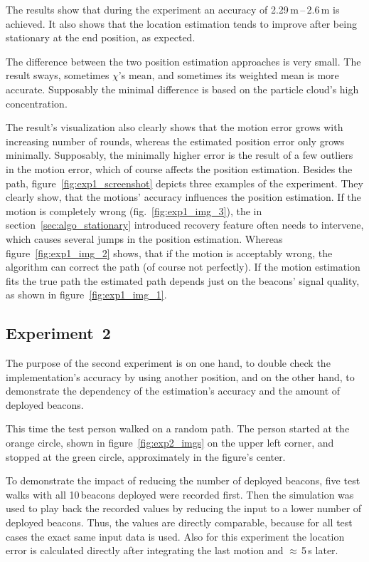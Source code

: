The results show that during the experiment an accuracy of 2.29\,m\,--\,2.6\,m is achieved. It also shows that the location estimation tends to improve after being stationary at the end position, as expected.

The difference between the two position estimation approaches is very small. The result sways, sometimes $\chi$'s mean, and sometimes its weighted mean is more accurate. Supposably the minimal difference is based on the particle cloud's high concentration.

The result's visualization also clearly shows that the motion error grows with increasing number of rounds, whereas the estimated position error only grows minimally. Supposably, the minimally higher error is the result of a few outliers in the motion error, which of course affects the position estimation. Besides the path, figure~\ref{fig:exp1_screenshot} depicts three examples of the experiment. They clearly show, that the motions' accuracy influences the position estimation. If the motion is completely wrong (fig.\ \ref{fig:exp1_img_3}), the in section~\ref{sec:algo_stationary} introduced recovery feature often needs to intervene, which causes several jumps in the position estimation. Whereas figure~\ref{fig:exp1_img_2} shows, that if the motion is acceptably wrong, the algorithm can correct the path (of course not perfectly). If the motion estimation fits the true path the estimated path depends just on the beacons' signal quality, as shown in figure~\ref{fig:exp1_img_1}.

\subsection*{Experiment~2}
The purpose of the second experiment is on one hand, to double check the implementation's accuracy by using another position, and on the other hand, to demonstrate the dependency of the estimation's accuracy and the amount of deployed beacons.

This time the test person walked on a random path. The person started at the orange circle, shown in figure~\ref{fig:exp2_imgs} on the upper left corner, and stopped at the green circle, approximately in the figure's center.

To demonstrate the impact of reducing the number of deployed beacons, five test walks with all 10\,beacons deployed were recorded first. Then the simulation was used to play back the recorded values by reducing the input to a lower number of deployed beacons. Thus, the values are directly comparable, because for all test cases the exact same input data is used. Also for this experiment the location error is calculated directly after integrating the last motion and $\approx$\,5\,s later.


